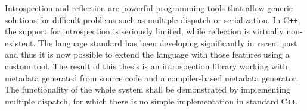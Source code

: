\documentclass[12pt]{report}
\newcommand{\Cpp}{C\texttt{++}}
\begin{document}

Introspection and reflection are powerful programming tools that allow generic solutions for difficult problems such as multiple dispatch or serialization. In \Cpp{}, the support for introspection is seriously limited, while reflection is virtually non-existent. The language standard has been developing significantly in recent past and thus it is now possible to extend the language with those features using a custom tool. The result of this thesis is an introspection library working with metadata generated from source code and a compiler-based metadata generator. The functionality of the whole system shall be demonstrated by implementing multiple dispatch, for which there is no simple implementation in standard \Cpp{}.
\end{document}
